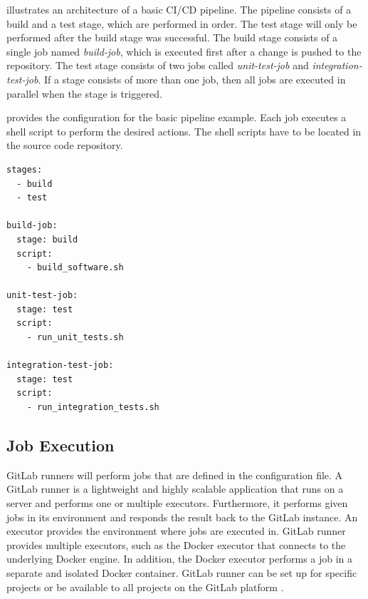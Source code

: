  illustrates an architecture of a basic CI/CD pipeline.
The pipeline consists of a build and a test stage, which are performed in order. The test stage will only be performed after the build stage was successful.
The build stage consists of a single job named \textit{build-job}, which is executed first after a change is pushed to the repository.
The test stage consists of two jobs called \textit{unit-test-job} and \textit{integration-test-job}. If a stage consists of more than one job, then all jobs are executed in parallel when the stage is triggered.



 provides the configuration for the basic pipeline example.
Each job executes a shell script to perform the desired actions. The shell scripts have to be located in the source code repository.
\begin{lstlisting}[label=lst:04_gitlab_pipeline_basic_config-example, caption=Example of a \texttt{.gitlab-ci.yml} configuration file]
stages:
  - build
  - test

build-job:
  stage: build
  script:
    - build_software.sh

unit-test-job:
  stage: test
  script:
    - run_unit_tests.sh
    
integration-test-job:
  stage: test
  script:
    - run_integration_tests.sh
\end{lstlisting}


\subsection{Job Execution}
\label{sec:04_background_gitlab_job}
GitLab runners will perform jobs that are defined in the configuration file. 
A GitLab runner is a lightweight and highly scalable application that runs on a server and performs one or multiple executors. Furthermore, it performs given jobs in its environment and responds the result back to the GitLab instance.
An executor provides the environment where jobs are executed in. GitLab runner provides multiple executors, such as the Docker executor that connects to the underlying Docker engine. In addition, the Docker executor performs a job in a separate and isolated Docker container.
GitLab runner can be set up for specific projects or be available to all projects on the GitLab platform \cite{Gitlab2020Docs}.


